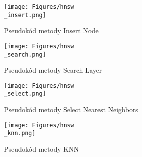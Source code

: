 \documentclass[czech,semestral,dept460,male,csharp,cpdeclaration]{diploma}
\begin{document}
		\begin{figure}
			\centering
			\texttt{[image: Figures/hnsw\\\_insert.png]}
			\caption{Pseudokód metody Insert Node}
			\label{hnsw_insert}
		\end{figure}
		
		\begin{figure}
			\centering
			\texttt{[image: Figures/hnsw\\\_search.png]}
			\caption{Pseudokód metody Search Layer}
			\label{hnsw_search}
		\end{figure}
	
		\begin{figure}
			\centering
			\texttt{[image: Figures/hnsw\\\_select.png]}
			\caption{Pseudokód metody Select Nearest Neighbors}
			\label{hnsw_select}
		\end{figure}
		
		\begin{figure}
			\centering
			\texttt{[image: Figures/hnsw\\\_knn.png]}
			\caption{Pseudokód metody KNN}
			\label{hnsw_knn}
		\end{figure}
		
\end{document}
